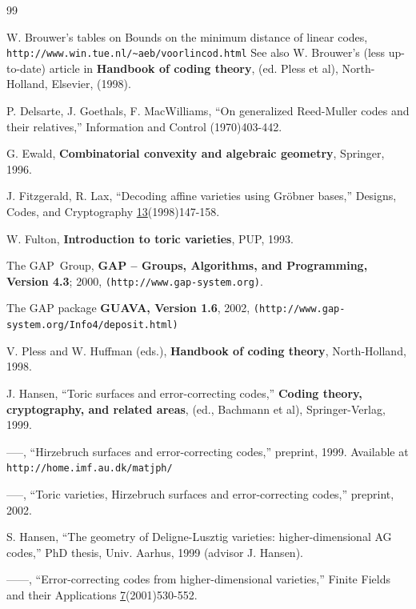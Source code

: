 \documentclass[12pt]{article}
\begin{document}
\begin{thebibliography}{99}  


 W. Brouwer's tables on
Bounds on the minimum distance of linear codes,
\newline
\verb+http://www.win.tue.nl/~aeb/voorlincod.html+
\newline
See also W. Brouwer's (less up-to-date) article in 
{\bf Handbook of coding theory}, (ed. Pless et al),
North-Holland, Elsevier, (1998).

 P. Delsarte, J. Goethals, F. MacWilliams,
``On generalized Reed-Muller codes and their relatives,''
Information and Control (1970)403-442.


 G. Ewald, {\bf Combinatorial convexity and algebraic geometry}, 
Springer, 1996.

 J. Fitzgerald, R. Lax, ``Decoding affine varieties
using Gr\"obner bases,'' Designs, Codes, and Cryptography
\underline{13}(1998)147-158.

W. Fulton, {\bf Introduction to toric varieties}, PUP, 1993.

The GAP~Group, {\bf GAP -- Groups, Algorithms, and Programming, 
Version 4.3}; 2000, \verb+(http://www.gap-system.org)+.

The GAP package {\bf GUAVA, Version 1.6}, 2002, 
\verb+(http://www.gap-system.org/Info4/deposit.html)+

 V. Pless and W. Huffman (eds.),
{\bf Handbook of coding theory}, North-Holland, 1998.

 J. Hansen, ``Toric surfaces and error-correcting
codes,'' {\bf Coding theory, cryptography, and related areas},
(ed., Bachmann et al), Springer-Verlag, 1999.

 -----, ``Hirzebruch surfaces and error-correcting
codes,'' preprint, 1999. Available at
\newline
\verb+http://home.imf.au.dk/matjph/+

 -----, ``Toric varieties,
Hirzebruch surfaces and error-correcting
codes,'' preprint, 2002. 

 S. Hansen, ``The geometry of Deligne-Lusztig
varieties: higher-dimensional AG codes,'' PhD thesis, 
Univ. Aarhus, 1999 (advisor J. Hansen).

 ------, ``Error-correcting codes from
higher-dimensional varieties,'' Finite Fields and their 
Applications \underline{7}(2001)530-552.


\end{thebibliography}
\end{document}
